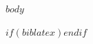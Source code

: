 \documentclass[$if(fontsize)$$fontsize$$else$11pt$endif$, $if(papersize)$$papersize$$else$letterpaper$endif$]{article}
\begin{document}
$body$

$if(biblatex)$\printbibliography$endif$
\end{document}
